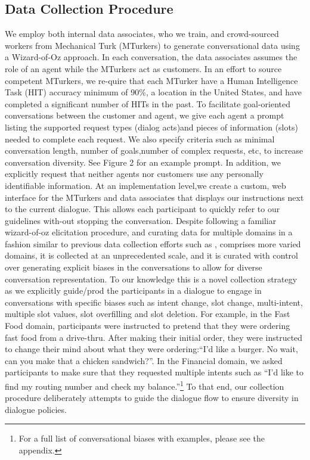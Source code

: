 \subsection{Data Collection Procedure}
We employ both internal data associates, who we train,  and crowd-sourced workers from Mechanical  Turk  (MTurkers)  to  generate  conversational data using a Wizard-of-Oz approach. In each conversation, the data associates assumes the role of an agent while the MTurkers act as customers.  In an  effort  to  source  competent  MTurkers,  we  re-quire  that  each  MTurker  have  a  Human  Intelligence  Task  (HIT)  accuracy  minimum  of  90\%,  a location in the United States, and have completed a significant number of HITs in the past. To facilitate goal-oriented conversations between the customer  and  agent,  we  give  each  agent  a  prompt listing  the  supported  request  types  (dialog  acts)and pieces of information (slots) needed to complete each request.  We also specify criteria such as minimal conversation length, number of goals,number of complex requests, etc, to increase conversation diversity.  See Figure 2 for an example prompt. In addition, we explicitly request that neither agents nor customers use any personally identifiable information.  At an implementation level,we create a custom, web interface for the MTurkers and data associates that displays our instructions next to the current dialogue. This allows each participant to quickly refer to our guidelines with-out stopping the conversation.
Despite following a familiar wizard-of-oz elicitation procedure, and curating data for multiple domains in a fashion similar to previous data collection efforts such as \multiwoz, \multidogo comprises more varied domains, it is collected at an unprecedented scale, and it is curated with control over generating explicit biases in the conversations to allow for diverse conversation representation. To our knowledge this is a novel collection strategy as we explicitly guide/prod the participants in a dialogue to engage in conversations with specific biases such as intent change, slot change, multi-intent, multiple slot values, slot overfilling and slot deletion. 
For example, in the Fast Food domain, participants were instructed to pretend that they were ordering fast food from a drive-thru. After making their initial order, they were instructed to change their mind about what they were ordering:``I'd like a burger. No wait, can you make that a chicken sandwich?''. In the Financial domain, we asked participants to make sure that they requested multiple intents such as ``I'd like to find my routing number and check my balance.''\footnote{For a full list of conversational biases with examples, please see the appendix.}
To that end, our collection procedure deliberately attempts to guide the dialogue flow to ensure diversity in dialogue policies.


